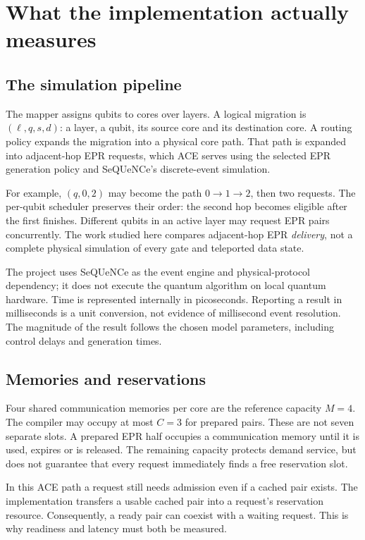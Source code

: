 \documentclass[11pt,a4paper,oneside]{report}
\begin{document}


\chapter{What the implementation actually measures}
\section{The simulation pipeline}
The mapper assigns qubits to cores over layers. A logical migration is $(\ell,q,s,d)$: a layer, a qubit, its source core and its destination core. A routing policy expands the migration into a physical core path. That path is expanded into adjacent-hop EPR requests, which ACE serves using the selected EPR generation policy and SeQUeNCe's discrete-event simulation.

For example, $(q,0,2)$ may become the path $0\to1\to2$, then two requests. The per-qubit scheduler preserves their order: the second hop becomes eligible after the first finishes. Different qubits in an active layer may request EPR pairs concurrently. The work studied here compares adjacent-hop EPR \emph{delivery}, not a complete physical simulation of every gate and teleported data state.

The project uses SeQUeNCe as the event engine and physical-protocol dependency; it does not execute the quantum algorithm on local quantum hardware. Time is represented internally in picoseconds. Reporting a result in milliseconds is a unit conversion, not evidence of millisecond event resolution. The magnitude of the result follows the chosen model parameters, including control delays and generation times.

\section{Memories and reservations}
Four shared communication memories per core are the reference capacity $M=4$. The compiler may occupy at most $C=3$ for prepared pairs. These are not seven separate slots. A prepared EPR half occupies a communication memory until it is used, expires or is released. The remaining capacity protects demand service, but does not guarantee that every request immediately finds a free reservation slot.

In this ACE path a request still needs admission even if a cached pair exists. The implementation transfers a usable cached pair into a request's reservation resource. Consequently, a ready pair can coexist with a waiting request. This is why readiness and latency must both be measured.
\end{document}
